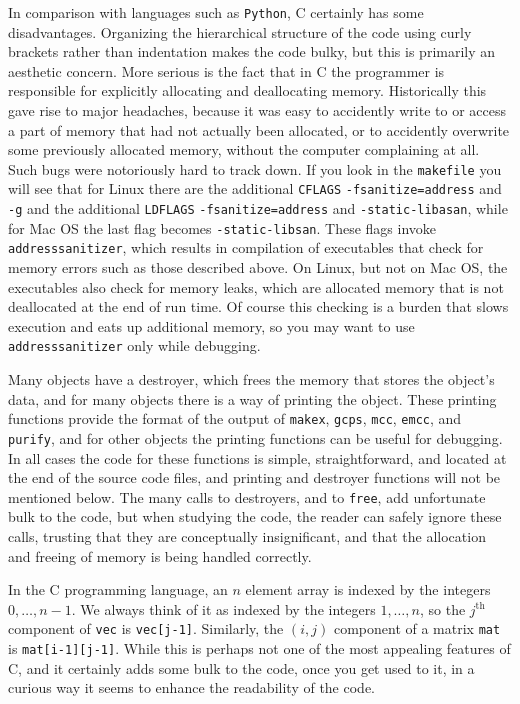 \documentclass[12pt]{article}
\theoremstyle{definition}
\begin{document}
\begin{appendix}
In comparison with languages such as \texttt{Python}, C certainly has
some disadvantages.  Organizing the hierarchical structure of the code
using curly brackets rather than indentation makes the code bulky, but
this is primarily an aesthetic concern.  More serious is the fact that
in C the programmer is responsible for explicitly allocating and
deallocating memory.  Historically this gave rise to major headaches,
because it was easy to accidently write to or access a part of memory
that had not actually been allocated, or to accidently overwrite some
previously allocated memory, without the computer complaining at all.
Such bugs were notoriously hard to track down.  If you look in the
\texttt{makefile} you will see that for Linux there are the additional
\texttt{CFLAGS} \texttt{-fsanitize=address} and \texttt{-g} and the
additional \texttt{LDFLAGS} \texttt{-fsanitize=address} and
\texttt{-static-libasan}, while for Mac OS the last flag becomes
\texttt{-static-libsan}.  These flags invoke
\texttt{addresssanitizer}, which results in compilation of executables
that check for memory errors such as those described above.  On Linux,
but not on Mac OS, the executables also check for memory leaks, which
are allocated memory that is not deallocated at the end of run time.
Of course this checking is a burden that slows execution and eats up
additional memory, so you may want to use \texttt{addresssanitizer}
only while debugging.

Many objects have a destroyer, which frees the memory that stores the
object's data, and for many objects there is a way of printing the
object.  These printing functions provide the format of the output of
\texttt{makex}, \texttt{gcps}, \texttt{mcc}, \texttt{emcc}, and
\texttt{purify}, and for other objects the printing functions can be
useful for debugging.  In all cases the code for these functions is
simple, straightforward, and located at the end of the source code
files, and printing and destroyer functions will not be mentioned
below.  The many calls to destroyers, and to \texttt{free}, add
unfortunate bulk to the code, but when studying the code, the reader
can safely ignore these calls, trusting that they are conceptually
insignificant, and that the allocation and freeing of memory is being
handled correctly.

In the C programming language, an $n$ element array is indexed by the
integers $0, \ldots, n-1$.  We always think of it as indexed by the
integers $1, \ldots, n$, so the $j^{\text{th}}$ component of
\texttt{vec} is \texttt{vec[j-1]}.  Similarly, the $(i,j)$ component
of a matrix \texttt{mat} is \texttt{mat[i-1][j-1]}.  While this is
perhaps not one of the most appealing features of C, and it certainly
adds some bulk to the code, once you get used to it, in a curious way
it seems to enhance the readability of the code.


\end{appendix}
\end{document}
